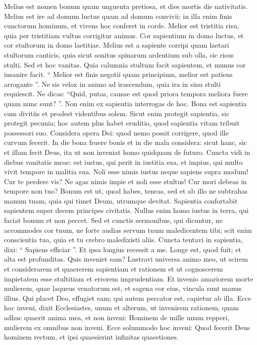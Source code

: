 \begin{biblechapter}
\begin{biblechapter}
\begin{biblechapter}
\begin{biblechapter}
\begin{biblechapter}
\begin{biblechapter}
\begin{biblechapter}
\verse Melius est nomen bonum quam unguenta pretiosa,
 et dies mortis die nativitatis.
 \verse Melius est ire ad domum luctus
 quam ad domum convivii;
 in illa enim finis cunctorum hominum,
 et vivens hoc conferet in corde.
 \verse Melior est tristitia risu,
 quia per tristitiam vultus corrigitur animus.
 \verse Cor sapientium in domo luctus,
 et cor stultorum in domo laetitiae.
 \verse Melius est a sapiente corripi
 quam laetari stultorum canticis,
 \verse quia sicut sonitus spinarum ardentium sub olla,
 sic risus stulti.
 Sed et hoc vanitas.
 \verse Quia calumnia stultum facit sapientem,
 et munus cor insanire facit.
 \verse “ Melior est finis negotii quam principium,
 melior est patiens arrogante ”.
 \verse Ne sis velox in animo ad irascendum, quia ira in sinu stulti requiescit. 
 \verse Ne dicas: “Quid, putas, causae est quod priora tempora meliora fuere quam nunc sunt? ”. Non enim ex sapientia interrogas de hoc. 
\verse Bona est sapientia cum divitiis et prodest videntibus solem. 
\verse Sicut enim protegit sapientia, sic protegit pecunia; hoc autem plus habet eruditio, quod sapientia vitam tribuit possessori suo. 
\verse Considera opera Dei: quod nemo possit corrigere, quod ille curvum fecerit. 
\verse In die bona fruere bonis et in die mala considera: sicut hanc, sic et illam fecit Deus, ita ut non inveniat homo quidquam de futuro.
 \verse Cuncta vidi in diebus vanitatis meae: est iustus, qui perit in iustitia sua, et impius, qui multo vivit tempore in malitia sua.
 \verse Noli esse nimis iustus
 neque sapiens supra modum!
 Cur te perdere vis?
 \verse Ne agas nimis impie
 et noli esse stultus!
 Cur mori debeas in tempore non tuo?
 \verse Bonum est ut, quod habes, teneas, sed et ab illo ne subtrahas manum tuam, quia qui timet Deum, utrumque devitat. 
\verse Sapientia confortabit sapientem super decem principes civitatis. 
\verse Nullus enim homo iustus in terra, qui faciat bonum et non peccet. 
\verse Sed et cunctis sermonibus, qui dicuntur, ne accommodes cor tuum, ne forte audias servum tuum maledicentem tibi; 
\verse scit enim conscientia tua, quia et tu crebro maledixisti aliis.
 \verse Cuncta tentavi in sapientia, dixi: “ Sapiens efficiar ”. 
\verse Et ipsa longius recessit a me. Longe est, quod fuit; et alta est profunditas. Quis inveniet eam?
 \verse Lustravi universa animo meo, ut scirem et considerarem et quaererem sapientiam et rationem et ut cognoscerem impietatem esse stultitiam et errorem imprudentiam. 
\verse Et invenio amariorem morte mulierem, quae laqueus venatorum est, et sagena cor eius, vincula sunt manus illius. Qui placet Deo, effugiet eam; qui autem peccator est, capietur ab illa. 
\verse Ecce hoc inveni, dixit Ecclesiastes, unum et alterum, ut invenirem rationem, 
\verse quam adhuc quaerit anima mea, et non inveni:
 Hominem de mille unum repperi,
 mulierem ex omnibus non inveni.
 \verse Ecce solummodo hoc inveni:
 Quod fecerit Deus hominem rectum,
 et ipsi quaesierint infinitas quaestiones.
 

\end{biblechapter}
\end{biblechapter}
\end{biblechapter}
\end{biblechapter}
\end{biblechapter}
\end{biblechapter}
\end{biblechapter}
